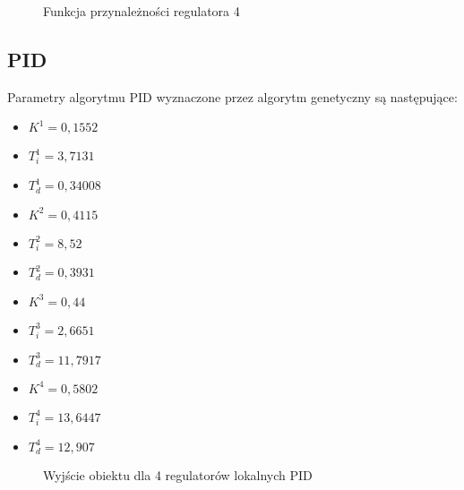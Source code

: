 \begin{figure}[H]
\centering
{}
\caption{Funkcja przynależności regulatora 4}
\label{fig:mi4_4}
\end{figure}

\subsection{PID}
Parametry algorytmu PID wyznaczone przez algorytm genetyczny są następujące:
\begin{itemize}
\item $K^1 = 0,1552$
\item $T^1_i = 3,7131$
\item $T^1_d = 0,34008$
\\
\item $K^2 = 0,4115$
\item $T^2_i = 8,52$
\item $T^2_d = 0,3931$
\\
\item $K^3 = 0,44$
\item $T^3_i = 2,6651$
\item $T^3_d = 11,7917$
\\
\item $K^4 = 0,5802$
\item $T^4_i = 13,6447$
\item $T^4_d = 12,907$
\end{itemize}

\begin{figure}[H]
\centering
{}
\caption{Wyjście obiektu dla 4 regulatorów lokalnych PID}
\label{fig:4_reg_pid_y}
\end{figure}

